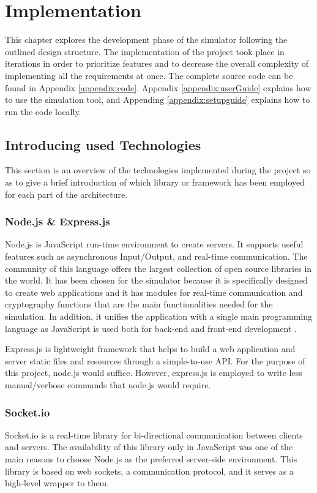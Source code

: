 \chapter{Implementation} \label{chapter:implementation}
This chapter explores the development phase of the simulator following the outlined design structure. The implementation of the project took place in iterations in order to prioritize features and to decrease the overall complexity of implementing all the requirements at once. The complete source code can be found in Appendix \ref{appendix:code}. Appendix \ref{appendix:userGuide} explains how to use the simulation tool, and Appending \ref{appendix:setupguide} explains how to run the code locally.


\section{Introducing used Technologies}
This section is an overview of the technologies implemented during the project so as to give a brief introduction of which library or framework has been employed for each part of the architecture.


\subsection{Node.js \& Express.js}
Node.js is JavaScript run-time environment to create servers. It supports useful features such as asynchronous Input/Output, and real-time communication. The community of this language offers the largest collection of open source libraries in the world. It has been chosen for the simulator because it is specifically designed to create web applications and it has modules for real-time communication and cryptography functions that are the main functionalities needed for the simulation. In addition, it unifies the application with a single main programming language as JavaScript is used both for back-end and front-end development \cite{Nodejs}. 

Express.js is lightweight framework that helps to build a web application and server static files and resources through a simple-to-use API. For the purpose of this project, node.js would suffice. However, express.js is employed to write less manual/verbose commands that node.js would require.

\subsection{Socket.io}
Socket.io is a real-time library for bi-directional communication between clients and servers. The availability of this library only in JavaScript was one of the main reasons to choose Node.js as the preferred server-side environment. This library is based on web sockets, a communication protocol, and it serves as a high-level wrapper to them.

